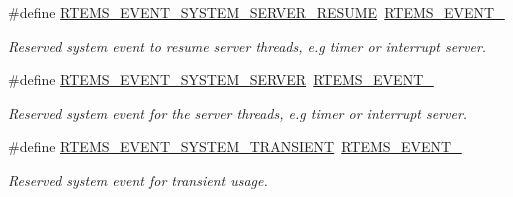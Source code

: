 \begin{DoxyCompactItemize}
\#define \mbox{\hyperlink{group__ClassicEventSystem_gaea80c956d9d5356eb9ef093699fc2f5a}{R\+T\+E\+M\+S\+\_\+\+E\+V\+E\+N\+T\+\_\+\+S\+Y\+S\+T\+E\+M\+\_\+\+S\+E\+R\+V\+E\+R\+\_\+\+R\+E\+S\+U\+ME}}~\mbox{\hyperlink{group__ClassicEventSet_ga23dda51c332b49103563828555a5e15d}{R\+T\+E\+M\+S\+\_\+\+E\+V\+E\+N\+T\+\_}}
\begin{DoxyCompactList}\small\item\em Reserved system event to resume server threads, e.\+g timer or interrupt server. \end{DoxyCompactList}\item 
\mbox{\label{group__ClassicEventSystem_gaf05efb059f870211f21c09cb211abe3d}} 
\#define \mbox{\hyperlink{group__ClassicEventSystem_gaf05efb059f870211f21c09cb211abe3d}{R\+T\+E\+M\+S\+\_\+\+E\+V\+E\+N\+T\+\_\+\+S\+Y\+S\+T\+E\+M\+\_\+\+S\+E\+R\+V\+ER}}~\mbox{\hyperlink{group__ClassicEventSet_ga9b0618f3eab8b9fb4b1d0fb7f0d1cd7a}{R\+T\+E\+M\+S\+\_\+\+E\+V\+E\+N\+T\+\_}}
\begin{DoxyCompactList}\small\item\em Reserved system event for the server threads, e.\+g timer or interrupt server. \end{DoxyCompactList}\item 
\mbox{\label{group__ClassicEventSystem_gace35bdbb8d804a49ca2d5eff5a90e214}} 
\#define \mbox{\hyperlink{group__ClassicEventSystem_gace35bdbb8d804a49ca2d5eff5a90e214}{R\+T\+E\+M\+S\+\_\+\+E\+V\+E\+N\+T\+\_\+\+S\+Y\+S\+T\+E\+M\+\_\+\+T\+R\+A\+N\+S\+I\+E\+NT}}~\mbox{\hyperlink{group__ClassicEventSet_gac9fdddefb1a966354c315634c2390b66}{R\+T\+E\+M\+S\+\_\+\+E\+V\+E\+N\+T\+\_}}
\begin{DoxyCompactList}\small\item\em Reserved system event for transient usage. \end{DoxyCompactList}\end{DoxyCompactItemize}
